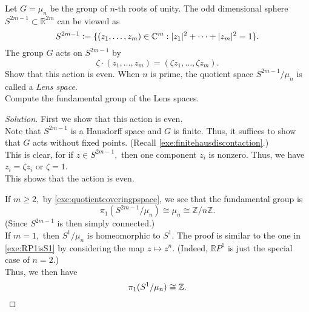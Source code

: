 \documentclass[12pt]{article}
\newenvironment{soln}{\begin{proof}[Solution]}{\end{proof}}
\begin{document}
\begin{exe}
	Let $G = \mu_n$ be the group of $n$-th roots of unity. The odd dimensional sphere $S^{2m - 1} \subset \mathbb{R}^{2m}$ can be viewed as
	\begin{equation*} 
		S^{2m - 1} \vcentcolon= \{(z_1, \ldots, z_m) \in \mathbb{C}^m : |z_1|^2 + \cdots + |z_m|^2 = 1\}.
	\end{equation*}
	The group $G$ acts on $S^{2m - 1}$ by 
	\begin{equation*} 
		\zeta\cdot(z_1, \ldots, z_m) = (\zeta z_1, \ldots, \zeta z_m).
	\end{equation*}
	Show that this action is even. When $n$ is prime, the quotient space $S^{2m - 1}/\mu_n$ is called a \emph{Lens space}.\\
	Compute the fundamental group of the Lens spaces.
\end{exe}
\begin{soln}
	First we show that this action is even. \\
	Note that $S^{2m - 1}$ is a Hausdorff space and $G$ is finite. Thus, it suffices to show that $G$ acts without fixed points. (Recall \cref{exe:finitehausdiscontaction}.)\\
	This is clear, for if $z \in S^{2m - 1},$ then one component $z_i$ is nonzero. Thus, we have $z_i = \zeta z_i$ or $\zeta = 1.$\\
	This shows that the action is even. 

	If $m \ge 2,$ by \cref{exe:quotientcoveringpspace}, we see that the fundamental group is 
	\begin{equation*} 
		\pi_1(S^{2m - 1}/\mu_n) \cong \mu_n \cong \mathbb{Z}/n\mathbb{Z}.
	\end{equation*} (Since $S^{2m - 1}$ is then simply connected.) \\
	If $m = 1,$ then $S^1/\mu_n$ is homeomorphic to $S^1.$ The proof is similar to the one in \cref{exe:RP1isS1} by considering the map $z \mapsto z^n.$ (Indeed, $\mathbb{R}P^1$ is just the special case of $n = 2.$)\\
	Thus, we then have
	\begin{equation*} 
		\pi_1(S^1/\mu_n) \cong \mathbb{Z}. \qedhere
	\end{equation*}
\end{soln}
\end{document}
